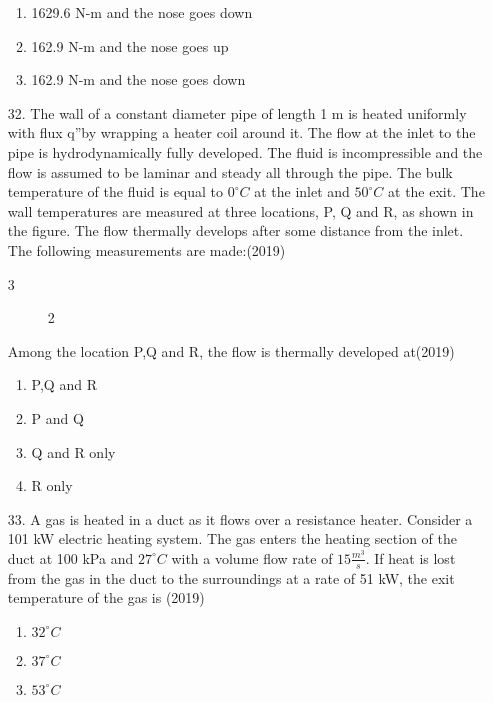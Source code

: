 \documentclass[journal]{IEEEtran}
\begin{document}
\begin{enumerate}
\begin{enumerate}[label=(\Alph*)]
        \item 1629.6 N-m and the nose goes down
        \item 162.9 N-m and the nose goes up
        \item 162.9 N-m and the nose goes down
    \end{enumerate}
    \item[32.] The wall of a constant diameter pipe of length 1 m is heated uniformly with flux q''by wrapping a heater coil around it. The flow at the inlet to the pipe is hydrodynamically fully developed. The fluid is incompressible and the flow is assumed to be laminar and steady all through the pipe. The bulk temperature of the fluid is equal to  $0^{\circ}C$ at the inlet and $50^{\circ}C$ at the exit. The wall temperatures are measured at three locations, P, Q and R, as shown in the figure. The flow thermally develops  after some distance from the inlet. The following measurements are made:\hfill (2019)
    \begin{table}
        \centering
        \caption{3}
    \end{table}
    \begin{figure}[!ht]
        \centering
        \caption{2}
    \end{figure}
    Among the location P,Q and R, the flow is thermally developed at\hfill (2019)
    \begin{enumerate}[label=(\Alph*)]
        \item  P,Q and R 
        \item P and Q 
        \item Q and R only 
        \item R only 
    \end{enumerate}
    \item[33.] A gas is heated in a duct as it flows over a resistance heater. Consider a 101 kW electric heating system. The gas enters the heating section of the duct at 100 kPa and $27^{\circ}C$ with a volume flow rate of $15 \frac{m^3}{s}$. If heat is lost from the gas in the duct to the surroundings at a rate of 51 kW, the exit temperature of the gas is \hfill (2019)
    \begin{enumerate}[label=(\Alph*)]
        \item $32^{\circ}C$
        \item $37^{\circ}C$
        \item $53^{\circ}C$

\end{enumerate}
\end{enumerate}
\end{document}

